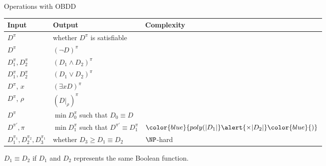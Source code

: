 \begin{frame}{Operations with OBDD}
      \begin{tabular}{|l|l|l|}
        \hline
        Input & Output & Complexity \\
        \hline
        $D^{\pi}$ & whether $D^{\pi}$ is satisfiable & \color{blue}{$O(|D|)$} \\
        \hline
        $D^{\pi}$ &  $(\lnot D)^{\pi}$ & \color{blue}{$O(|D|)$} \\
        \hline
        $D_1^{\pi}, D_2^{\pi}$ &  $(D_1\land D_2)^{\pi}$ & \color{blue}{$O(|D_1|\times |D_2|)$} \\
        \hline
        $D_1^{\pi}, D_2^{\pi}$ &  $(D_1\lor D_2)^{\pi}$ & \color{blue}{$O(|D_1|\times |D_2|)$} \\
        \hline
        $D^{\pi}$, $x$ &  $(\exists x D)^{\pi}$ & \color{blue}{$O(|D|)$} \\
        \hline
        $D^{\pi}$, $\rho$  &  $(D|_\rho)^{\pi}$ & \color{blue}{$O(|D|)$} \\
        \hline
        $D^{\pi}$ &  $\min D_0^{\pi}$ such that $D_0 \equiv D$ & \color{blue}{$O(|D|)$} \\
        \hline
        $D^{\pi'}, \pi$ &  $\min D_1^{\pi}$ such that $D^{\pi'} \equiv D_1^{\pi}$ &
                                    $\color{blue}{poly(|D_1|} \alert{\times |D_2|} \color{blue}{)}$ \\
        \hline
        $D_1^{\pi_1}, D_2^{\pi_2}, D_3^{\pi_1}$ & whether $D_3 \ge D_1 \equiv D_2$ & \alert{$\NP$-hard} \\
        \hline
      \end{tabular}

    \bigskip
	$D_1 \equiv D_2$ if $D_1$ and $D_2$ represents the same Boolean function.
\end{frame}
